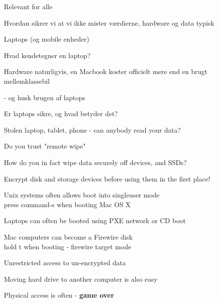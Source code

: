 \documentclass[Screen16to9,17pt]{foils}
\begin{document}

\begin{list2}
\item Relevant for alle
\item Hvordan sikrer vi at vi ikke mister værdierne, hardware og data typisk
\end{list2}




\begin{list2}
\item Laptops (og mobile enheder)
\item Hvad kendetegner en laptop?
\item Hardware naturligvis, en Macbook koster officielt mere end en brugt mellemklassebil
\item - og husk brugen af laptops
\item Er laptops sikre, og hvad betyder det?
\end{list2}





\begin{list1}
\item Stolen laptop, tablet, phone - can anybody read your data?
\item Do you trust "remote wipe"
\item How do you in fact wipe data securely off devices, and SSDs?
\item Encrypt disk and storage devices before using them in the first place!
\end{list1}


\begin{list1}
\item Unix systems often allows boot into singleuser mode\\
press command-s when booting Mac OS X
\item Laptops can often be booted using PXE network or CD boot
\item Mac computers can become a Firewire disk\\
hold t when booting - firewire target mode
\item Unrestricted access to un-encrypted data
\item Moving hard drive to another computer is also easy
\end{list1}
\pause
\centerline{Physical access is often - {\bf game over}}
\end{document}
